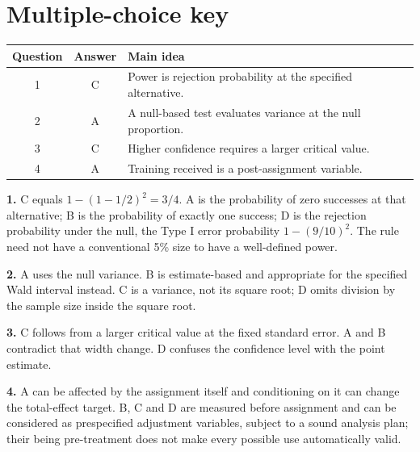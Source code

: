 \documentclass[11pt]{article}
\begin{document}
\section*{Multiple-choice key}
\begin{tabular}{ccl}
\toprule Question & Answer & Main idea\\\midrule
1 & C & Power is rejection probability at the specified alternative.\\
2 & A & A null-based test evaluates variance at the null proportion.\\
3 & C & Higher confidence requires a larger critical value.\\
4 & A & Training received is a post-assignment variable.\\\bottomrule
\end{tabular}

\textbf{1.} C equals $1-(1-1/2)^2=3/4$. A is the probability of zero successes at that alternative; B is the probability of exactly one success; D is the rejection probability under the null, the Type I error probability $1-(9/10)^2$. The rule need not have a conventional 5\% size to have a well-defined power.

\textbf{2.} A uses the null variance. B is estimate-based and appropriate for the specified Wald interval instead. C is a variance, not its square root; D omits division by the sample size inside the square root.

\textbf{3.} C follows from a larger critical value at the fixed standard error. A and B contradict that width change. D confuses the confidence level with the point estimate.

\textbf{4.} A can be affected by the assignment itself and conditioning on it can change the total-effect target. B, C and D are measured before assignment and can be considered as prespecified adjustment variables, subject to a sound analysis plan; their being pre-treatment does not make every possible use automatically valid.
\end{document}
